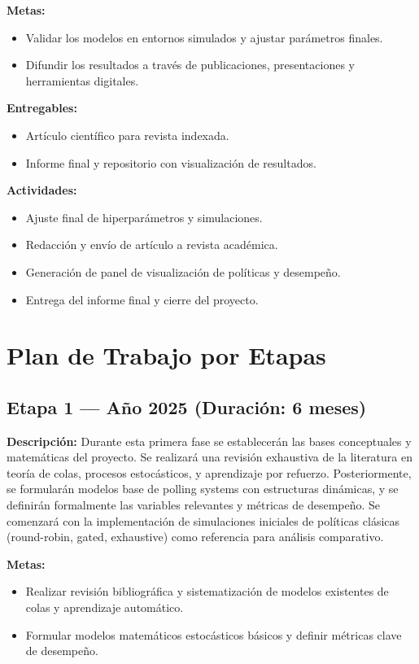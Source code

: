 \documentclass[12pt]{article}
\begin{document}
\textbf{Metas:}
\begin{itemize}
  \item Validar los modelos en entornos simulados y ajustar parámetros finales.
  \item Difundir los resultados a través de publicaciones, presentaciones y herramientas digitales.
\end{itemize}

\textbf{Entregables:}
\begin{itemize}
  \item Artículo científico para revista indexada.
  \item Informe final y repositorio con visualización de resultados.
\end{itemize}

\textbf{Actividades:}
\begin{itemize}
  \item Ajuste final de hiperparámetros y simulaciones.
  \item Redacción y envío de artículo a revista académica.
  \item Generación de panel de visualización de políticas y desempeño.
  \item Entrega del informe final y cierre del proyecto.
\end{itemize}

\section{Plan de Trabajo por Etapas}

\subsection*{Etapa 1 — Año 2025 (Duración: 6 meses)}
\textbf{Descripción:} Durante esta primera fase se establecerán las bases conceptuales y matemáticas del proyecto. Se realizará una revisión exhaustiva de la literatura en teoría de colas, procesos estocásticos, y aprendizaje por refuerzo. Posteriormente, se formularán modelos base de polling systems con estructuras dinámicas, y se definirán formalmente las variables relevantes y métricas de desempeño. Se comenzará con la implementación de simulaciones iniciales de políticas clásicas (round-robin, gated, exhaustive) como referencia para análisis comparativo.

\textbf{Metas:}
\begin{itemize}
  \item Realizar revisión bibliográfica y sistematización de modelos existentes de colas y aprendizaje automático.
  \item Formular modelos matemáticos estocásticos básicos y definir métricas clave de desempeño.
\end{itemize}
\end{document}

